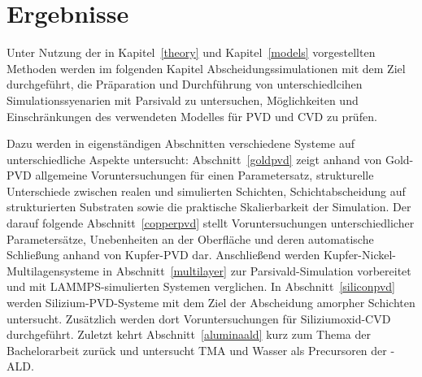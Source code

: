 \chapter{Ergebnisse}
\label{results}

Unter Nutzung der in Kapitel~\ref{theory} und Kapitel~\ref{models} vorgestellten Methoden werden im folgenden Kapitel Abscheidungssimulationen mit dem Ziel durchgeführt, die Präparation und Durchführung von unterschiedlcihen Simulationssyenarien mit Parsivald zu untersuchen, Möglichkeiten und Einschränkungen des verwendeten Modelles für PVD und CVD zu prüfen.

Dazu werden in eigenständigen Abschnitten verschiedene Systeme auf unterschiedliche Aspekte untersucht:
Abschnitt~\ref{goldpvd} zeigt anhand von Gold-PVD allgemeine Voruntersuchungen für einen Parametersatz, strukturelle Unterschiede zwischen realen und simulierten Schichten, Schichtabscheidung auf strukturierten Substraten sowie die praktische Skalierbarkeit der Simulation.
Der darauf folgende Abschnitt~\ref{copperpvd} stellt Voruntersuchungen unterschiedlicher Parametersätze, Unebenheiten an der Oberfläche und deren automatische Schließung anhand von Kupfer-PVD dar.
Anschließend werden Kupfer-Nickel-Multilagensysteme in Abschnitt~\ref{multilayer} zur Parsivald-Simulation vorbereitet und mit LAMMPS-simulierten Systemen verglichen.
In Abschnitt~\ref{siliconpvd} werden Silizium-PVD-Systeme mit dem Ziel der Abscheidung amorpher Schichten untersucht.
Zusätzlich werden dort Voruntersuchungen für Siliziumoxid-CVD durchgeführt.
Zuletzt kehrt Abschnitt~\ref{aluminaald} kurz zum Thema der Bachelorarbeit zurück und untersucht TMA und Wasser als Precursoren der -ALD.


\clearpage

\clearpage

\clearpage

\clearpage

